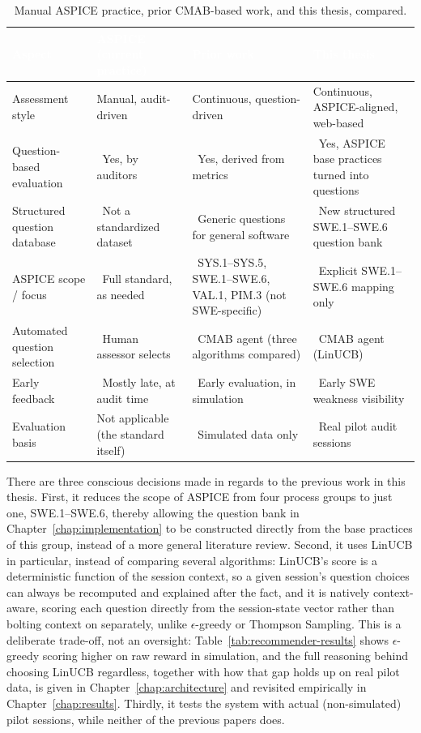\documentclass[a4paper, 12pt, oneside, openany, BCOR1cm,toc=chapterentrywithdots]{scrbook}
\newcommand{\cmark}{\textcolor{green!45!black}{\ding{51}}}
\newcommand{\xmark}{\textcolor{red!60!black}{\ding{55}}}
\newcommand{\thw}[1]{\textcolor{white}{\textbf{#1}}}
\begin{document}
\begin{table}[h]
\centering
{}
\begin{tabular}{p{2.7cm} p{3.0cm} p{3.6cm} p{3.6cm}}
\toprule
\rowcolor{green!55!black}
\thw{Aspect} & \thw{ASPICE (current practice)} &
\thw{Prior work~\cite{datsogiannis2024early,datsogiannis2025recommender}} &
\thw{This thesis} \\
\midrule
Assessment style & Manual, audit-driven & Continuous, question-driven & Continuous,
ASPICE-aligned, web-based \\
Question-based evaluation & \cmark\ Yes, by auditors & \cmark\ Yes, derived from metrics &
\cmark\ Yes, ASPICE base practices turned into questions \\
Structured question database & \xmark\ Not a standardized dataset & \cmark\ Generic questions for
general software & \cmark\ New structured SWE.1--SWE.6 question bank \\
ASPICE scope / focus & \cmark\ Full standard, as needed & \xmark\ SYS.1--SYS.5, SWE.1--SWE.6,
VAL.1, PIM.3 (not SWE-specific) & \cmark\ Explicit SWE.1--SWE.6 mapping only \\
Automated question selection & \xmark\ Human assessor selects & \cmark\ CMAB agent (three
algorithms compared) & \cmark\ CMAB agent (LinUCB) \\
Early feedback & \xmark\ Mostly late, at audit time & \cmark\ Early evaluation, in simulation &
\cmark\ Early SWE weakness visibility \\
Evaluation basis & Not applicable (the standard itself) & \xmark\ Simulated data only & \cmark\
Real pilot audit sessions \\
\bottomrule
\end{tabular}
\caption{Manual ASPICE practice, prior CMAB-based work, and this thesis, compared.}
\label{tab:cross-comparison}
\end{table}

There are three conscious decisions made in regards to the previous work in this thesis. First,
it reduces the scope of ASPICE from four process groups to just one, SWE.1--SWE.6, thereby
allowing the question bank in Chapter~\ref{chap:implementation} to be constructed directly from
the base practices of this group, instead of a more general literature review. Second, it uses
LinUCB in particular, instead of comparing several algorithms: LinUCB's score is a deterministic
function of the session context, so a given session's question choices can always be recomputed
and explained after the fact, and it is natively context-aware, scoring each question directly
from the session-state vector rather than bolting context on separately, unlike $\epsilon$-greedy
or Thompson Sampling. This is a deliberate trade-off, not an oversight:
Table~\ref{tab:recommender-results} shows $\epsilon$-greedy scoring higher on raw reward in
simulation, and the full reasoning behind choosing LinUCB regardless, together with how that gap
holds up on real pilot data, is given in Chapter~\ref{chap:architecture} and revisited
empirically in Chapter~\ref{chap:results}. Thirdly, it tests the system with actual
(non-simulated) pilot sessions, while neither of the previous papers does.
\end{document}
